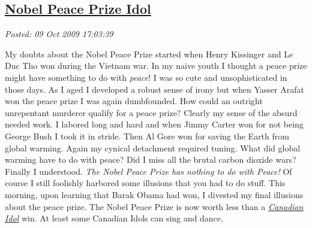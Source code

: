 %

\subsection*{\href{http://bakerjd99.wordpress.com/2009/10/09/nobel-peace-prize-idol/}{Nobel Peace Prize Idol}}


\noindent\emph{Posted: 09 Oct 2009 17:03:39}
\vspace{6pt}

My doubts about the Nobel Peace Prize started when Henry Kissinger and
Le Duc Tho won during the Vietnam war. In my naive youth I thought a
peace prize might have something to do with \emph{peace}! I was so cute
and unsophisticated in those days. As I aged I developed a robust sense
of irony but when Yasser Arafat won the peace prize I was again
dumbfounded. How could an outright unrepentant murderer qualify for a
peace prize? Clearly my sense of the absurd needed work. I labored long
and hard and when Jimmy Carter won for not being George Bush I took it
in stride. Then Al Gore won for saving the Earth from global warming.
Again my cynical detachment required tuning. What did global warming
have to do with peace? Did I miss all the brutal carbon dioxide wars?
Finally I understood. \emph{The Nobel Peace Prize has nothing to do with
Peace!} Of course I still foolishly harbored some illusions that you had
to do stuff. This morning, upon learning that Barak Obama had won, I
divested my final illusions about the peace prize. The Nobel Peace Prize
is now worth less than a
\emph{\href{http://www.ctv.ca/idol/gen/Home.html}{Canadian Idol}} win.
At least some Canadian Idols can sing and dance.


%